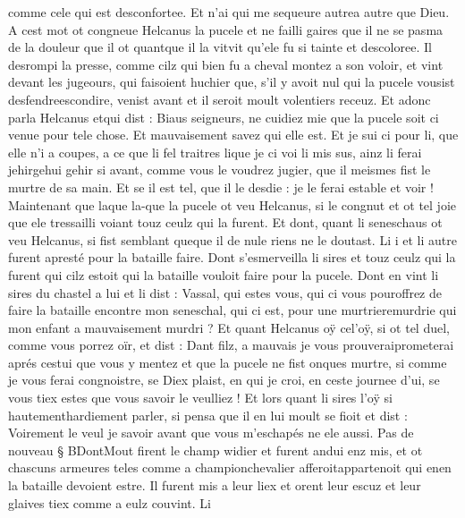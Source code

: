\documentclass{article}
\begin{document}
\begin{pages}
      comme cele qui est desconfortee. Et n’ai qui me sequeure 
      autrea autre que Dieu. \pend
\pstart A cest mot ot congneue Helcanus
   la pucele et ne failli gaires que il ne se pasma de la douleur
   que il ot quantque 
   il la vitvit qu'ele fu si tainte et descoloree. Il desrompi la presse, 
   comme cilz qui bien fu a cheval montez a son voloir, et vint devant les 
   jugeours, qui faisoient huchier que, s’il y avoit nul 
      qui la pucele vousist desfendreescondire, 
      venist avant et il seroit moult volentiers receuz.
   Et adonc parla Helcanus etqui dist :
   Biaus seigneurs, ne cuidiez mie que la pucele soit ci venue pour 
      tele chose. Et mauvaisement savez qui elle est. Et je sui ci pour li, que elle n’i a coupes, a ce que 
      li fel traitres 
      lique je ci voi li mis sus, ainz li ferai
      jehirgehui gehir si avant, comme vous le voudrez jugier, 
      que il meismes fist le murtre de sa main. Et se il est tel, que il le desdie : je le ferai estable
      et voir ! \pend
\pstart Maintenant que laque la-que la
   pucele ot veu Helcanus, si le congnut et ot tel joie que ele 
   tressailli voiant touz ceulz qui la furent. Et dont, quant 
   li seneschaus ot veu Helcanus, si fist semblant 
   queque il de nule 
   riens ne le doutast. Li i et li autre furent apresté pour la bataille faire. Dont s’esmerveilla 
   li sires et touz ceulz qui la furent qui cilz estoit qui la bataille vouloit faire 
   pour la pucele. Dont en vint 
   li sires 
      du chastel a lui 
   et li dist :
   Vassal, qui estes vous, qui ci vous pouroffrez de faire la bataille encontre 
      mon seneschal, qui ci est,
      pour une murtrieremurdrie qui 
      mon enfant a mauvaisement 
      murdri ?
   Et quant Helcanus oÿ cel'oÿ, 
   si ot tel duel, comme vous porrez oïr, et dist :
   Dant filz, a mauvais je vous prouveraiprometerai
      aprés cestui que vous y mentez et que la pucele ne fist onques murtre, si comme je vous ferai 
      congnoistre, se Diex plaist, en qui je croi, en ceste journee d’ui,
      se vous tiex estes que vous savoir le veulliez !
   Et lors quant li sires l’oÿ si
   hautementhardiement parler, si pensa que 
   il en lui moult se fioit et dist :
   Voirement le veul je savoir avant que vous m’eschapés ne ele aussi. \pend
\pstart Pas de nouveau § BDontMout 
   firent le champ widier et furent andui enz mis, et ot chascuns armeures teles comme a
   championchevalier
   afferoitappartenoit qui 
   enen la bataille devoient estre. Il furent mis a leur liex et orent leur 
   escuz et leur glaives tiex comme a eulz couvint. Li 

\end{pages}
\end{document}
